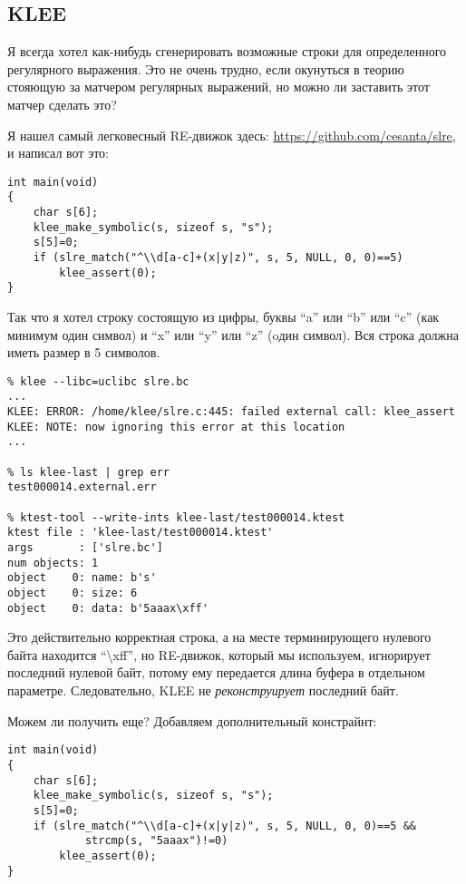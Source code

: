 \subsection{KLEE}

Я всегда хотел как-нибудь сгенерировать возможные строки для определенного регулярного выражения.
Это не очень трудно, если окунуться в теорию стояющую за матчером регулярных выражений, но можно ли заставить
этот матчер сделать это?

Я нашел самый легковесный RE-движок здесь: \url{https://github.com/cesanta/slre}, и написал вот это:

\begin{lstlisting}
int main(void)
{
	char s[6];
	klee_make_symbolic(s, sizeof s, "s");
	s[5]=0;
	if (slre_match("^\\d[a-c]+(x|y|z)", s, 5, NULL, 0, 0)==5)
		klee_assert(0);
}
\end{lstlisting}

Так что я хотел строку состоящую из цифры, буквы ``a'' или ``b'' или ``c'' (как минимум один символ) и ``x'' или ``y'' или ``z'' (oдин символ).
Вся строка должна иметь размер в 5 символов.

\begin{lstlisting}
% klee --libc=uclibc slre.bc
...
KLEE: ERROR: /home/klee/slre.c:445: failed external call: klee_assert
KLEE: NOTE: now ignoring this error at this location
...

% ls klee-last | grep err
test000014.external.err

% ktest-tool --write-ints klee-last/test000014.ktest
ktest file : 'klee-last/test000014.ktest'
args       : ['slre.bc']
num objects: 1
object    0: name: b's'
object    0: size: 6
object    0: data: b'5aaax\xff'
\end{lstlisting}

Это действительно корректная строка, а на месте терминирующего нулевого байта находится ``\textbackslash{}xff'',
но RE-движок, который мы используем, игнорирует последний нулевой байт, потому ему передается длина буфера в отдельном параметре.
Следовательно, KLEE не \textit{реконструирует} последний байт.

Можем ли получить еще?
Добавляем дополнительный констрайнт:

\begin{lstlisting}
int main(void)
{
	char s[6];
	klee_make_symbolic(s, sizeof s, "s");
	s[5]=0;
	if (slre_match("^\\d[a-c]+(x|y|z)", s, 5, NULL, 0, 0)==5 &&
			strcmp(s, "5aaax")!=0)
		klee_assert(0);
}
\end{lstlisting}

